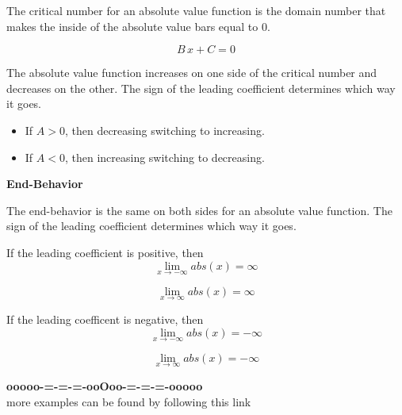\documentclass{ximera}
\begin{document}
The critical number for an absolute value function is the domain number that makes the inside of the absolute value bars equal to $0$.


\[
B \, x + C = 0
\]


The absolute value function increases on one side of the critical number and decreases on the other.  The sign of the leading coefficient determines which way it goes. 




\begin{itemize}
  \item If $A > 0$, then decreasing switching to increasing.
  \item If $A < 0$, then increasing switching to decreasing.
\end{itemize}










\textbf{End-Behavior}


The end-behavior is the same on both sides for an absolute value function. The sign of the leading coefficient determines which way it goes.


If the leading coefficient is positive, then 
\[
\lim_{x \to -\infty} abs(x) = \infty 
\]
 
\[
\lim_{x \to \infty} abs(x) = \infty 
\]







If the leading coefficent is negative, then 
\[
\lim_{x \to -\infty} abs(x) = -\infty 
\]
 
\[
\lim_{x \to \infty} abs(x) = -\infty 
\]











\begin{onlineOnly}
\begin{center}
\textbf{\textcolor{green!50!black}{ooooo-=-=-=-ooOoo-=-=-=-ooooo}} \\

more examples can be found by following this link\\ 

\end{center}
\end{onlineOnly}
\end{document}
